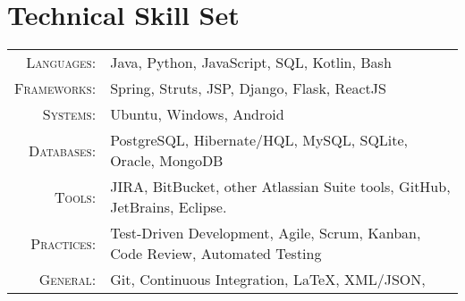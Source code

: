 \section{Technical Skill Set}

\begin{tabular}{r|p{11cm}}
	\textsc{Languages}: & Java, Python, JavaScript, SQL, Kotlin, Bash \\
	\textsc{Frameworks}: & Spring, Struts, JSP, Django, Flask, ReactJS \\
	\textsc{Systems}: & Ubuntu, Windows, Android \\
	\textsc{Databases}: & PostgreSQL, Hibernate/HQL, MySQL, SQLite, Oracle, MongoDB \\
	\textsc{Tools}: & JIRA, BitBucket, other Atlassian Suite tools, GitHub, JetBrains, Eclipse. \\
	\textsc{Practices}: & Test-Driven Development, Agile, Scrum, Kanban, Code Review, Automated Testing \\
	\textsc{General}: & Git, Continuous Integration, LaTeX, XML/JSON,  \\
\end{tabular}
